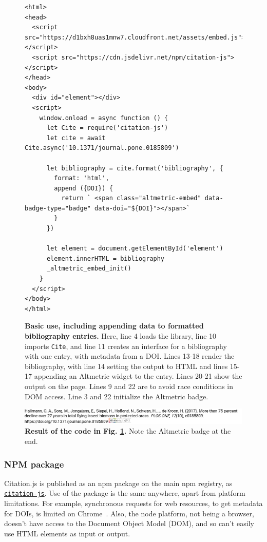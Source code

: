 \documentclass[fleqn,10pt,lineno]{wlpeerj} %
\begin{document}
\begin{figure}[bt!]
\centering
\begin{tiny}
\begin{verbatim}
<html>
<head>
  <script src="https://d1bxh8uas1mnw7.cloudfront.net/assets/embed.js"></script>
  <script src="https://cdn.jsdelivr.net/npm/citation-js"></script>
</head>
<body>
  <div id="element"></div>
  <script>
    window.onload = async function () {
      let Cite = require('citation-js')
      let cite = await Cite.async('10.1371/journal.pone.0185809')
      
      let bibliography = cite.format('bibliography', {
        format: 'html',
        append ({DOI}) {
          return ` <span class="altmetric-embed" data-badge-type="badge" data-doi="${DOI}"></span>`
        }
      })
    
      let element = document.getElementById('element')
      element.innerHTML = bibliography
      _altmetric_embed_init()
    }
  </script>
</body>
</html>
\end{verbatim}
\end{tiny}
\caption{\textbf{Basic use, including appending data to formatted bibliography entries.}
Here, line 4 loads the library, line 10 imports \texttt{Cite}, and line 11 creates an interface for a bibliography with one entry, with metadata from a DOI. Lines 13-18 render the bibliography, with line 14 setting the output to HTML and lines 15-17 appending an Altmetric widget to the entry. Lines 20-21 show the output on the page. Lines 9 and 22 are to avoid race conditions in DOM access. Line 3 and 22 initialize the Altmetric badge.
}
\label{code:use}
\end{figure}

\begin{figure}[ht]
\centering
\includegraphics[width=\linewidth]{figures/use_altmetric.png}
\caption{\textbf{Result of the code in Fig. \ref{code:use}.} Note the Altmetric badge at the end.}
\label{fig:use}
\end{figure}

\subsubsection*{NPM package}

Citation.js is published as an npm package on the main npm registry, as \href{https://npm.im/citation-js}{\texttt{citation-js}}. Use of the package is the same anywhere, apart from platform limitations. For example, synchronous requests for web resources, to get metadata for DOIs, is limited on Chrome~\citep{willighagen_make_2017}. Also, the node platform, not being a browser, doesn't have access to the Document Object Model (DOM), and so can't easily use HTML elements as input or output.
\end{document}
